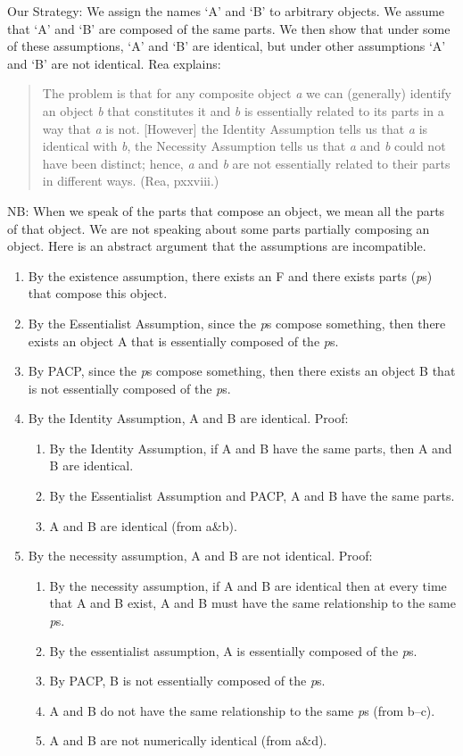 \documentclass[9pt]{article}
\begin{document}
Our Strategy: We assign the names `A' and `B' to arbitrary objects. We assume  that `A' and `B' are composed of the same parts. We then show that under some of these assumptions, `A' and `B' are identical, but under other assumptions `A' and  `B' are not identical. Rea explains: 
\begin{quote}The problem is that for any composite object \emph{a} we can (generally) identify an object \emph{b}  that constitutes it and \emph{b} is essentially related to its parts in a way that \emph{a} is not. [However] the  Identity Assumption tells us that \emph{a} is identical with \emph{b}, the Necessity Assumption tells us that \emph{a} and \emph{b} could not have been distinct; hence, \emph{a} and \emph{b} are not essentially related to their parts in different ways. (Rea, pxxviii.) 
\end{quote}
NB: When we speak of the parts that compose an object, we mean all the parts of  that object. We are not speaking about some parts partially composing an  object. Here is an abstract argument that the assumptions are incompatible. 

\begin{enumerate}
\item By the existence assumption, there exists an F and there exists parts (\emph{p}s) that compose this object. 
\item By the Essentialist Assumption, since the \emph{p}s compose something, then there exists an object A that is essentially composed of the \emph{p}s. 
\item By PACP, since the \emph{p}s compose something, then there exists an object B  that is not essentially composed of the \emph{p}s. 
\item By the Identity Assumption, A and B are identical. Proof: 
\begin{enumerate}
\item By the Identity Assumption, if A and B have the same parts, then A and B are identical. 
\item By the Essentialist Assumption and PACP, A and B have the same parts. 
\item A and B are identical (from a\&b).
\end{enumerate}
\item By the necessity assumption, A and B are not identical. Proof: 
\begin{enumerate} 
\item By the necessity assumption, if A and B are identical then at every time that A and B exist, A and B must have the same relationship to the same \emph{p}s. 
\item By the essentialist assumption, A is essentially composed of the \emph{p}s. 
\item By PACP, B is not essentially composed of the \emph{p}s. 
\item A and B do not have the same relationship to the same \emph{p}s (from b--c).
\item A and B are not numerically identical (from a\&d).
\end{enumerate}
\end{enumerate}
\end{document}

